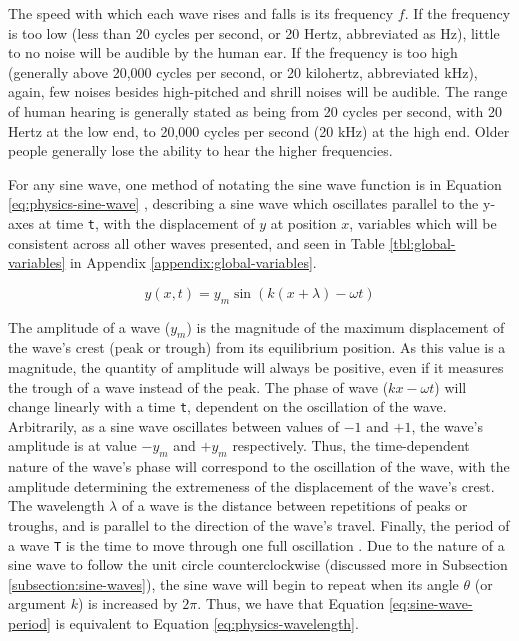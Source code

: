 The speed with which each wave rises and falls is its frequency $f$. If the frequency is too low (less than 20 cycles per second, or 20 Hertz, abbreviated as Hz), little to no noise will be audible by the human ear. If the frequency is too high (generally above 20,000 cycles per second, or 20 kilohertz, abbreviated kHz), again, few noises besides high-pitched and shrill noises will be audible. The range of human hearing is generally stated as being from 20 cycles per second, with 20 Hertz at the low end, to 20,000 cycles per second (20 kHz) at the high end. Older people generally lose the ability to hear the higher frequencies.

For any sine wave, one method of notating the sine wave function is in Equation \ref{eq:physics-sine-wave} \cite{Halliday_Resnick_Walker_2005}, describing a sine wave which oscillates parallel to the y-axes at time \texttt{t}, with the displacement of $y$ at position $x$, variables which will be consistent across all other waves presented, and seen in Table \ref{tbl:global-variables} in Appendix \ref{appendix:global-variables}.

\begin{equation}
	y(x,t) = y_m \sin(k(x + \lambda) - \omega t)
	\label{eq:physics-sine-wave}
\end{equation}

The amplitude of a wave ($y_m$) is the magnitude of the maximum displacement of the wave's crest (peak or trough) from its equilibrium position. As this value is a magnitude, the quantity of amplitude will always be positive, even if it measures the trough of a wave instead of the peak. The phase of wave ($kx - \omega t$) will change linearly with a time \texttt{t}, dependent on the oscillation of the wave. Arbitrarily, as a sine wave oscillates between values of $-1$ and $+1$, the wave's amplitude is at value $-y_m$ and $+y_m$ respectively. Thus, the time-dependent nature of the wave's phase will correspond to the oscillation of the wave, with the amplitude determining the extremeness of the displacement of the wave's crest. The wavelength $\lambda$ of a wave is the distance between repetitions of peaks or troughs, and is parallel to the direction of the wave's travel. Finally, the period of a wave \texttt{T} is the time to move through one full oscillation \cite{Halliday_Resnick_Walker_2005}. Due to the nature of a sine wave to follow the unit circle counterclockwise (discussed more in Subsection \ref{subsection:sine-waves}), the sine wave will begin to repeat when its angle $\theta$ (or argument $k$) is increased by $2\pi$. Thus, we have that Equation \ref{eq:sine-wave-period} is equivalent to Equation \ref{eq:physics-wavelength}.

